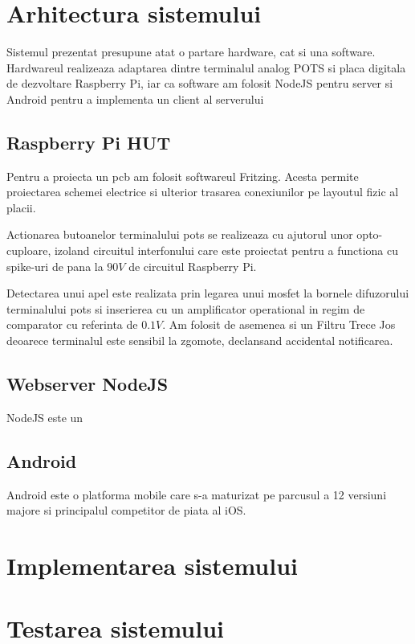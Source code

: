 \section {Arhitectura sistemului}

Sistemul prezentat presupune atat o partare hardware, cat si una software. Hardwareul realizeaza adaptarea dintre terminalul analog POTS si placa digitala de dezvoltare Raspberry Pi, iar ca software am folosit NodeJS pentru server si Android pentru a implementa un client al serverului

\subsection {Raspberry Pi HUT}

Pentru a proiecta un \acrfull{pcb} am folosit softwareul Fritzing. Acesta permite proiectarea schemei electrice si ulterior trasarea conexiunilor pe layoutul fizic al placii.

Actionarea butoanelor terminalului \acrshort{pots} se realizeaza cu ajutorul unor opto-cuploare, izoland circuitul interfonului care este proiectat pentru a functiona cu spike-uri de pana la $90V$ de circuitul Raspberry Pi.

Detectarea unui apel este realizata prin legarea unui \acrfull{mosfet} la bornele difuzorului terminalului \acrshort{pots} si inserierea cu un amplificator operational in regim de comparator cu referinta de $0.1V$. Am folosit de asemenea si un Filtru Trece Jos deoarece terminalul este sensibil la zgomote, declansand accidental notificarea.

\subsection {Webserver NodeJS}

NodeJS este un

\subsection {Android}

Android este o platforma mobile care s-a maturizat pe parcusul a 12 versiuni majore si principalul competitor de piata al iOS.


\section {Implementarea sistemului}


\section {Testarea sistemului}